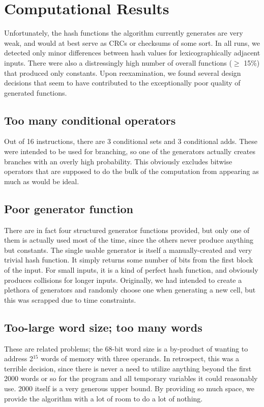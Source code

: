 \documentclass{article}
\begin{document}
\section{Computational Results}
Unfortunately, the hash functions the algorithm currently generates are very weak, and would at best serve as CRCs or checksums of some sort. In all runs, we detected only minor differences between hash values for lexicographically adjacent inputs.
There were also a distressingly high number of overall functions ($\geq$ 15\%) that produced only constants. Upon reexamination, we found several design decisions that seem to have contributed to the exceptionally poor quality of generated functions.

\subsection{Too many conditional operators}
Out of 16 instructions, there are 3 conditional sets and 3 conditional adds. These were intended to be used for branching, so one of the generators actually creates branches with an overly high probability. This obviously excludes bitwise operators that are supposed to do the bulk of the computation from appearing as much as would be ideal.

\subsection{Poor generator function}
There are in fact four structured generator functions provided, but only one of them is actually used most of the time, since the others never produce anything but constants. The single usable generator is itself a manually-created and very trivial hash function. It simply returns some number of bits from the first block of the input. For small inputs, it is a kind of perfect hash function, and obviously produces collisions for longer inputs. Originally, we had intended to create a plethora of generators and randomly choose one when generating a new cell, but this was scrapped due to time constraints.

\subsection{Too-large word size; too many words}
These are related problems; the 68-bit word size is a by-product of wanting to address 2$^{15}$ words of memory with three operands. In retrospect, this was a terrible decision, since there is never a need to utilize anything beyond the first 2000 words or so for the program and all temporary variables it could reasonably use. 2000 itself is a very generous upper bound. By providing so much space, we provide the algorithm with a lot of room to do a lot of nothing.
\end{document}
